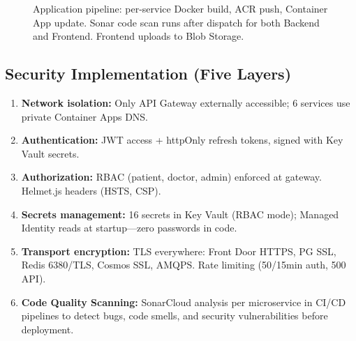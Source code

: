 \documentclass[12pt,a4paper]{article}
\begin{document}
\begin{figure}[H]
{
}
\caption{Application pipeline: per-service Docker build, ACR push, Container App update.
Sonar code scan runs after dispatch for both Backend and Frontend. Frontend uploads to Blob Storage.}
\label{fig:app-pipeline}
\end{figure}

\subsection{Security Implementation (Five Layers)}

\begin{enumerate}[noitemsep,topsep=2pt]
    \item \textbf{Network isolation:} Only API Gateway externally accessible; 6 services use private Container Apps DNS.
    \item \textbf{Authentication:} JWT access + httpOnly refresh tokens, signed with Key Vault secrets.
    \item \textbf{Authorization:} RBAC (patient, doctor, admin) enforced at gateway. Helmet.js headers (HSTS, CSP).
    \item \textbf{Secrets management:} 16 secrets in Key Vault (RBAC mode); Managed Identity reads at startup---zero passwords in code.
    \item \textbf{Transport encryption:} TLS everywhere: Front Door HTTPS, PG SSL, Redis 6380/TLS, Cosmos SSL, AMQPS. Rate limiting (50/15min auth, 500 API).
    \item \textbf{Code Quality Scanning:} SonarCloud analysis per microservice in CI/CD pipelines to detect bugs, code smells, and security vulnerabilities before deployment.
\end{enumerate}
\end{document}
